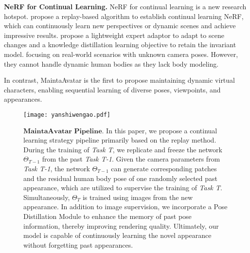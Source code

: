 \noindent\textbf{NeRF for Continual Learning.}
NeRF for continual learning is a new research hotspot. \cite{clnerf,meil,instant} propose a replay-based algorithm to establish continual learning NeRF, which can continuously learn new perspectives or dynamic scenes and achieve impressive results. \cite{cl-nerf} propose a lightweight expert adaptor to adapt to scene changes and a knowledge distillation learning objective to retain the invariant model. \cite{ILnerf} focusing on real-world scenarios with unknown camera poses. However, they cannot handle dynamic human bodies as they lack body modeling.

In contrast, MaintaAvatar is the first to propose maintaining dynamic virtual characters, enabling sequential learning of diverse poses, viewpoints, and appearances.
\label{sec:intro}

\begin{figure*}[t]
      \centering
      \texttt{[image: yanshiwengao.pdf]}
      \caption{$\textbf  {MaintaAvatar Pipeline.}$ In this paper, we propose a continual learning strategy pipeline primarily based on the replay method. 
      During the training of \textit{Task T}, we replicate and freeze the network $ {\Theta}_{T-1}$ from the past \textit{Task T-1}. Given the camera parameters from \textit{Task T-1}, the network $\Theta_{ T-1}$ can generate corresponding patches and the residual human body pose of one randomly selected past appearance, which are utilized to supervise the training of \textit{Task T}. Simultaneously, $\Theta_T$ 
      is trained using images from the new appearance. In addition to image supervision, we incorporate a Pose Distillation Module to enhance the memory of past pose information, thereby improving rendering quality. Ultimately, our model is capable of continuously learning the novel appearance without forgetting past appearances.}
      \label{fig:continuelearing}
\end{figure*}